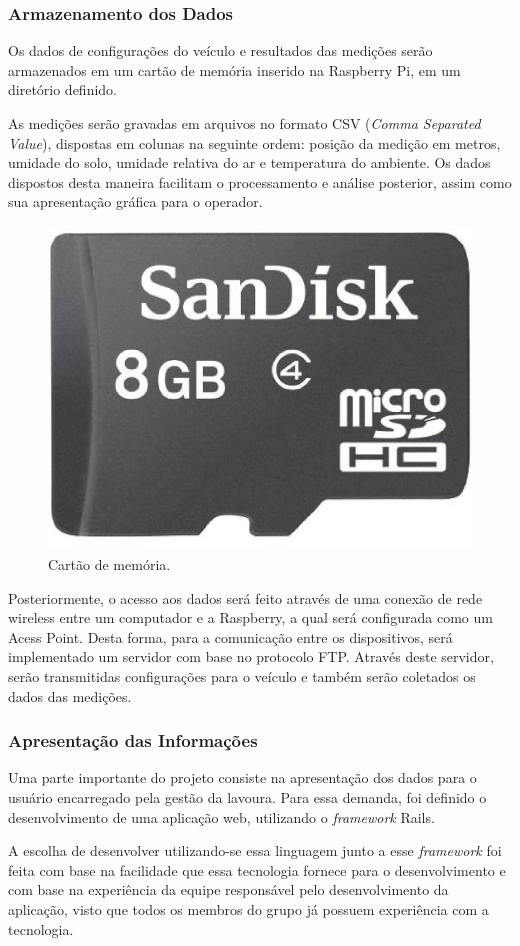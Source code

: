   \subsubsection{Armazenamento dos Dados}
  Os dados de configurações do veículo e resultados das medições serão armazenados
  em um cartão de memória inserido na Raspberry Pi, em um diretório definido.

  As medições serão gravadas em arquivos no formato CSV (\textit{Comma Separated Value}),
  dispostas em colunas na seguinte ordem: posição da medição
  em metros, umidade do solo, umidade relativa do ar e temperatura do
  ambiente.
  Os dados dispostos desta maneira facilitam o processamento e
  análise posterior, assim como sua apresentação gráfica para
  o operador.

  \begin{figure}[!htbp]
  \begin{center}
  \includegraphics[width=.2\textwidth]{figuras/sdcard.eps}
  \caption{\label{fig:sdcard}Cartão de memória.}
  \end{center}
  \end{figure}

  Posteriormente, o acesso aos dados será feito através de uma conexão de  rede
  wireless entre um computador e a Raspberry, a qual será configurada como
  um Acess Point. Desta forma, para a comunicação entre os
  dispositivos, será implementado um servidor com base no protocolo FTP. Através
  deste servidor, serão transmitidas configurações para o veículo e também serão
  coletados os dados das medições.

  \subsubsection{Apresentação das Informações}

  Uma parte importante do projeto consiste na apresentação dos
  dados para o usuário encarregado pela gestão da lavoura. Para essa demanda,
  foi definido o desenvolvimento de uma aplicação web, utilizando
  o \textit{framework} Rails.

  A escolha de desenvolver utilizando-se essa linguagem junto a
  esse \textit{framework} foi feita com base na facilidade que essa
  tecnologia fornece para o desenvolvimento e com base na experiência
  da equipe responsável pelo desenvolvimento da aplicação, visto que
  todos os membros do grupo já possuem experiência com a tecnologia.

